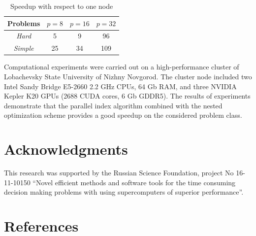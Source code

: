 \documentclass[a4paper]{jpconf}
\begin{document}
\begin{table}
\caption{Speedup with respect to one node}
\label{tab:3}
\begin{center}
\begin{tabular}{cccc}
\hline
Problems & $p = 8$ & $p=16$ & $p=32$ \\
\hline
\textit{Hard} & 5 & 9 & 96\\
\textit{Simple} & 25 & 34& 109\\
\hline
\end{tabular}
\end{center}
\end{table}

Computational experiments were carried out on a high-performance cluster of 
Lobachevsky State University of Nizhny Novgorod. The cluster node included 
two Intel Sandy Bridge E5-2660 2.2 GHz CPUs, 64 Gb RAM, and three NVIDIA 
Kepler K20 GPUs (2688 CUDA cores, 6 Gb GDDR5). 
The results of experiments demonstrate that the parallel index algorithm combined with the nested optimization scheme provides a good speedup on the considered problem class. 


\section*{Acknowledgments}
This research was supported by the Russian Science Foundation, project No 16-11-10150 ``Novel efficient methods
and software tools for the time consuming decision making problems with using supercomputers of superior performance''.

\bigskip

\section*{References}

\medskip
\end{document}
